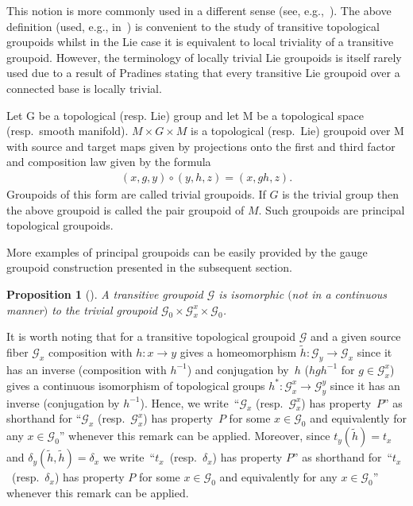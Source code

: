 \documentclass[pdftex]{sigma}
\newtheorem{prop}[tw]{Proposition}
\begin{document}
\begin{rem} This notion is more commonly used in a different sense (see, e.g.,~\cite{R}). The above definition (used, e.g., in~\cite{McK1}) is convenient to the study of transitive topological groupoids whilst in the Lie case it is equivalent to local triviality of a transitive groupoid. However, the terminology of locally trivial Lie groupoids is itself rarely used due to a result of Pradines stating that every transitive Lie groupoid over a connected base is locally trivial.
\end{rem}
\begin{egg}Let G be a topological (resp. Lie) group and let M be a topological space (resp.\ smooth manifold). $M\times G\times M$ is a topological (resp.\ Lie) groupoid over M with source and target maps given by projections onto the first and third factor and composition law given by the formula
\begin{gather*}
(x,g,y)\circ (y,h,z)=(x,gh,z).
\end{gather*}
Groupoids of this form are called trivial groupoids. If $G$ is the trivial group then the above groupoid is called the pair groupoid of $M$. Such groupoids are principal topological groupoids.
\end{egg}
More examples of principal groupoids can be easily provided by the gauge groupoid construction presented in the subsequent section.
\begin{prop}[{\cite[Proposition 3.2]{McK1}}] A transitive groupoid $\mathcal{G}$ is isomorphic $($not in a continuous manner$)$ to the trivial groupoid $\mathcal{G}_0\times\mathcal{G}^x_x\times\mathcal{G}_0$.
\end{prop}

\begin{rem} It is worth noting that for a transitive topological groupoid $\mathcal{G}$ and a given source fiber $\mathcal{G}_x$ composition with $h\colon x\rightarrow y$ gives a homeomorphism $\tilde{h}\colon \mathcal{G}_y\rightarrow \mathcal{G}_x$ since it has an inverse (composition with $h^{-1}$) and conjugation by~$h$ ($hgh^{-1}$ for $g\in\mathcal{G}_x^x$) gives a continuous isomorphism of topological groups $h^*\colon \mathcal{G}^x_x\rightarrow \mathcal{G}^y_y$ since it has an inverse (conjugation by $h^{-1}$). Hence, we write~``$\mathcal{G}_x$ (resp.~$\mathcal{G}_x^x$) has property~$P$'' as shorthand for ``$\mathcal{G}_x$ (resp.\ $\mathcal{G}^x_x$) has property~$P$ for some $x\in\mathcal{G}_0$ and equivalently for any $x\in\mathcal{G}_0$'' whenever this remark can be applied. Moreover, since $t_y(\tilde{h})=t_x$ and $\delta_y(\tilde{h},\tilde{h})=\delta_x$ we write~``$t_x$~(resp.~$\delta_x$) has property $P$'' as shorthand for~``$t_x$~(resp.~$\delta_x$) has property $P$ for some $x\in\mathcal{G}_0$ and equivalently for any $x\in\mathcal{G}_0$'' whenever this remark can be applied.
\end{rem}
\end{document}
